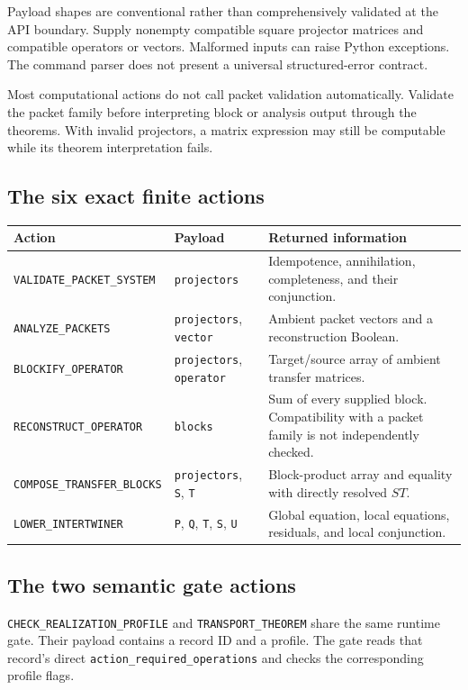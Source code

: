 \documentclass[a4paper,11pt]{article}
\begin{document}
Payload shapes are conventional rather than comprehensively validated at the API boundary. Supply nonempty compatible square projector matrices and compatible operators or vectors. Malformed inputs can raise Python exceptions. The command parser does not present a universal structured-error contract.

Most computational actions do not call packet validation automatically. Validate the packet family before interpreting block or analysis output through the theorems. With invalid projectors, a matrix expression may still be computable while its theorem interpretation fails.
\subsection{The six exact finite actions}
\begin{longtable}{@{}p{}p{}p{}@{}}
\toprule Action & Payload & Returned information\\\midrule\endhead
\nolinkurl{VALIDATE_PACKET_SYSTEM} & \nolinkurl{projectors} & Idempotence, annihilation, completeness, and their conjunction.\\
\nolinkurl{ANALYZE_PACKETS} & \nolinkurl{projectors}, \nolinkurl{vector} & Ambient packet vectors and a reconstruction Boolean.\\
\nolinkurl{BLOCKIFY_OPERATOR} & \nolinkurl{projectors}, \nolinkurl{operator} & Target/source array of ambient transfer matrices.\\
\nolinkurl{RECONSTRUCT_OPERATOR} & \nolinkurl{blocks} & Sum of every supplied block. Compatibility with a packet family is not independently checked.\\
\nolinkurl{COMPOSE_TRANSFER_BLOCKS} & \nolinkurl{projectors}, \nolinkurl{S}, \nolinkurl{T} & Block-product array and equality with directly resolved $ST$.\\
\nolinkurl{LOWER_INTERTWINER} & \nolinkurl{P}, \nolinkurl{Q}, \nolinkurl{T}, \nolinkurl{S}, \nolinkurl{U} & Global equation, local equations, residuals, and local conjunction.\\\bottomrule
\end{longtable}
\subsection{The two semantic gate actions}
\nolinkurl{CHECK_REALIZATION_PROFILE} and \nolinkurl{TRANSPORT_THEOREM} share the same runtime gate. Their payload contains a record ID and a profile. The gate reads that record's direct \nolinkurl{action_required_operations} and checks the corresponding profile flags.
\end{document}
